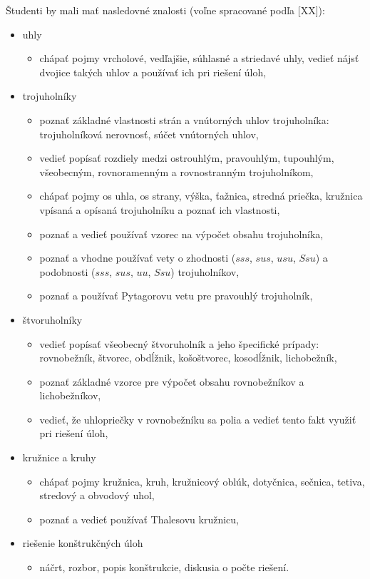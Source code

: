 \documentclass[11pt,a4paper,oneside,final]{book}
\begin{document}
Študenti by mali mať nasledovné znalosti (voľne spracované podľa [XX]):
\begin{itemize}
\item uhly
\begin{itemize}
\item chápať pojmy vrcholové, vedľajšie, súhlasné a striedavé uhly, vedieť nájsť dvojice takých uhlov a používať ich pri riešení úloh,
\end{itemize}
\item trojuholníky
\begin{itemize}
\item poznať základné vlastnosti strán a vnútorných uhlov trojuholníka: trojuholníková nerovnosť, súčet vnútorných uhlov,
\item vedieť popísať rozdiely medzi ostrouhlým, pravouhlým, tupouhlým, všeobecným, rovnoramenným a rovnostranným trojuholníkom,
\item chápať pojmy os uhla, os strany, výška, ťažnica, stredná priečka, kružnica vpísaná a opísaná trojuholníku a poznať ich vlastnosti,
\item poznať a vedieť používať vzorec na výpočet obsahu trojuholníka,
\item poznať a vhodne používať vety o zhodnosti ($sss$, $sus$, $usu$, $Ssu$) a podobnosti ($sss$, $sus$, $uu$, $Ssu$) trojuholníkov,
\item poznať a používať Pytagorovu vetu pre pravouhlý trojuholník,
\end{itemize}
\item štvoruholníky
\begin{itemize}
\item vedieť popísať všeobecný štvoruholník a jeho špecifické prípady: rovnobežník, štvorec, obdĺžnik, košoštvorec, kosodĺžnik, lichobežník,
\item poznať základné vzorce pre výpočet obsahu rovnobežníkov a lichobežníkov,
\item vedieť, že uhlopriečky v rovnobežníku sa polia a vedieť tento fakt využiť pri riešení úloh,
\end{itemize}
\item kružnice a kruhy
\begin{itemize}
\item chápať pojmy kružnica, kruh, kružnicový oblúk, dotyčnica, sečnica, tetiva, stredový a obvodový uhol,
\item poznať a vedieť používať Thalesovu kružnicu,
\end{itemize}
\item riešenie konštrukčných úloh
\begin{itemize}
\item náčrt, rozbor, popis konštrukcie, diskusia o počte riešení.
\end{itemize}
\end{itemize}
\end{document}
